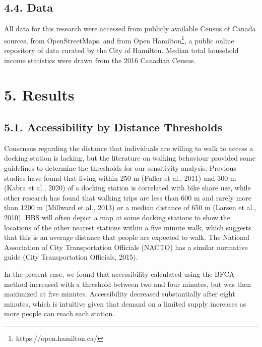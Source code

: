 \documentclass[]{elsarticle} %
\begin{document}
\hypertarget{data}{%
\subsection{4.4. Data}\label{data}}

All data for this research were accessed from publicly available Census
of Canada sources, from OpenStreetMaps, and from Open Hamilton\footnote{https://open.hamilton.ca/},
a public online repository of data curated by the City of Hamilton.
Median total household income statistics were drawn from the 2016
Canadian Census.

\hypertarget{results}{%
\section{5. Results}\label{results}}

\hypertarget{accessibility-by-distance-thresholds}{%
\subsection{5.1. Accessibility by Distance
Thresholds}\label{accessibility-by-distance-thresholds}}

Consensus regarding the distance that individuals are willing to walk to
access a docking station is lacking, but the literature on walking
behaviour provided some guidelines to determine the thresholds for our
sensitivity analysis. Previous studies have found that living within 250
m (Fuller et al., 2011) and 300 m (Kabra et al., 2020) of a docking
station is correlated with bike share use, while other research has
found that walking trips are less than 600 m and rarely more than 1200 m
(Millward et al., 2013) or a median distance of 650 m (Larsen et al.,
2010). HBS will often depict a map at some docking stations to show the
locations of the other nearest stations within a five minute walk, which
suggests that this is an average distance that people are expected to
walk. The National Association of City Transportation Officials (NACTO)
has a similar normative guide (City Transportation Officials, 2015).

In the present case, we found that accessibility calculated using the
BFCA method increased with a threshold between two and four minutes, but
was then maximized at five minutes. Accessibility decreased
substantially after eight minutes, which is intuitive given that demand
on a limited supply increases as more people can reach each station.
\end{document}
